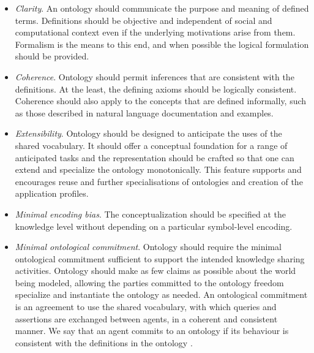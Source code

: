 	\begin{itemize}
		\item \textit{Clarity}. An ontology should communicate the purpose and meaning of defined terms. Definitions should be objective and independent of social and computational context even if the underlying motivations arise from them. Formalism is the means to this end, and when possible the logical formulation should be provided.
		\item \textit{Coherence}. Ontology should permit inferences that are consistent with the definitions. At the least, the defining axioms should be logically consistent. Coherence should also apply to the concepts that are defined informally, such as those described in natural language documentation and examples.
		\item \textit{Extensibility}. Ontology should be designed to anticipate the uses of the shared vocabulary. It should offer a conceptual foundation for a range of anticipated tasks and the representation should be crafted so that one can extend and specialize the ontology monotonically. This feature supports and encourages reuse and further specialisations of ontologies and creation of the application profiles. 
		\item \textit{Minimal encoding bias}. The conceptualization should be specified at the knowledge level without depending on a particular symbol-level encoding. 
		\item \textit{Minimal ontological commitment}. Ontology should require the minimal ontological commitment sufficient to support the intended knowledge sharing activities. Ontology should make as few claims as possible about the world being modeled, allowing the parties committed to the ontology freedom specialize and instantiate the ontology as needed. An ontological commitment is an agreement to use the shared vocabulary, with which queries and assertions are exchanged between agents, in a coherent and consistent manner. We say that an agent commits to an ontology if its behaviour is consistent with the definitions in the ontology \cite{gruber1995}.		
	\end{itemize}	